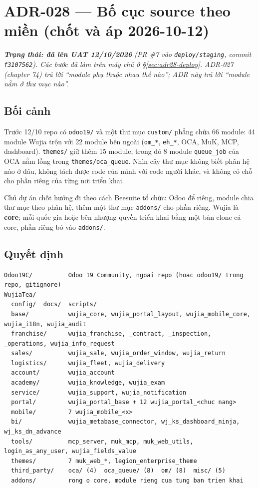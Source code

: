 \chapter{ADR-028 --- Bố cục source theo miền (chốt và áp 2026-10-12)}
\label{chap:adr28}
\sloppy

\emph{\textbf{Trạng thái: đã lên UAT 12/10/2026} (PR \#7 vào \texttt{deploy/staging}, commit \texttt{f3107562}).
Các bước đã làm trên máy chủ ở \S\ref{sec:adr28-deploy}. ADR-027 (chapter 74) trả lời
``module phụ thuộc nhau thế nào''; ADR này trả lời ``module nằm ở thư mục nào''.}

\section{Bối cảnh}

Trước 12/10 repo có \texttt{odoo19/} và một thư mục \texttt{custom/} phẳng chứa 66 module: 44 module Wujia trộn với
22 module bên ngoài (\texttt{om\_*}, \texttt{eh\_*}, OCA, MuK, MCP, dashboard). \texttt{themes/} giữ thêm 15 module,
trong đó 8 module \texttt{queue\_job} của OCA nằm lồng trong \texttt{themes/oca\_queue}. Nhìn cây thư mục không biết
phân hệ nào ở đâu, không tách được code của mình với code người khác, và không có chỗ cho phần riêng của từng nơi
triển khai.

Chủ dự án chốt hướng đi theo cách Beesuite tổ chức: Odoo để riêng, module chia thư mục theo phân hệ, thêm một thư mục
\texttt{addons/} cho phần riêng. Wujia là \textbf{core}; mỗi quốc gia hoặc bên nhượng quyền triển khai bằng một bản
clone cả core, phần riêng bỏ vào \texttt{addons/}.

\section{Quyết định}

\begin{lstlisting}[style=shell]
Odoo19C/          Odoo 19 Community, ngoai repo (hoac odoo19/ trong repo, gitignore)
WujiaTea/
  config/  docs/  scripts/
  base/           wujia_core, wujia_portal_layout, wujia_mobile_core, wujia_i18n, wujia_audit
  franchise/      wujia_franchise, _contract, _inspection, _operations, wujia_info_request
  sales/          wujia_sale, wujia_order_window, wujia_return
  logistics/      wujia_fleet, wujia_delivery
  account/        wujia_account
  academy/        wujia_knowledge, wujia_exam
  service/        wujia_support, wujia_notification
  portal/         wujia_portal_base + 12 wujia_portal_<chuc nang>
  mobile/         7 wujia_mobile_<x>
  bi/             wujia_metabase_connector, wj_ks_dashboard_ninja, wj_ks_dn_advance
  tools/          mcp_server, muk_mcp, muk_web_utils, login_as_any_user, wujia_fields_value
  themes/         7 muk_web_*, legion_enterprise_theme
  third_party/    oca/ (4)  oca_queue/ (8)  om/ (8)  misc/ (5)
  addons/         rong o core, module rieng cua tung ban trien khai
\end{lstlisting}

